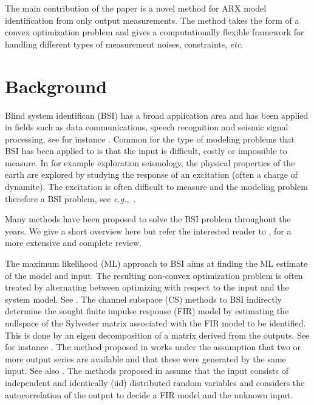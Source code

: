 \documentclass{ifacconf}
\newcommand{\0}{{\bf 0}}
\newcommand{\eg}{\textit{e.g.,~}}
\begin{document}
The main contribution of the paper is a novel method for ARX model
identification from only output measurements. The method takes the
form of a convex optimization problem and gives a computationally  flexible framework
for handling different types of measurement noises, constraints, \textit{etc}.  




\section{Background}
\label{sec:background}

Blind system identifican (BSI) has a broad application area and has
been applied in fields such as  data communications, speech
recognition and seismic signal processing, see for instance
\cite{Abed97}. Common for the type of modeling problems  that BSI has been
applied to is that the input is difficult, costly or impossible to
measure. In for example  exploration seismology, the physical
properties of the earth are explored by studying the response of
 an excitation (often a charge of dynamite). The excitation is often
 difficult to measure and the modeling problem therefore a BSI problem, see \eg \cite{Zerva199947}.

Many methods have been proposed to solve the BSI problem throughout
the years. We give a short overview here but refer the interested
reader to  \cite{Abed97,Hua02}, for a more extensive and complete review. 

The maximum likelihood (ML) approach to BSI aims at finding the ML
estimate of the model and input. The resulting non-convex optimization
problem is often treated by alternating between optimizing with respect to
the input and the system model.  See \cite{meraim:EUSIPCO:1994}. The
channel subspace (CS) methods to BSI  indirectly determine the sought
finite impulse response (FIR)  model by estimating the nullspace of
the Sylvester matrix associated with the FIR model to be identified. This is
done by an eigen decomposition of a matrix derived from the
outputs. See for instance \cite{Abed-Meraim:06}.
The method proposed in \cite{Zerva00} works under the assumption that
two or more output series are available and that these were generated
by the same input. See also \cite{Van13}. The methods proposed in \cite{Sato75,Tong91}
assume that the input consists of  independent and identically
(iid)  distributed random variables and considers the autocorrelation of the
output to decide a FIR model and the unknown
input. 
\end{document}
